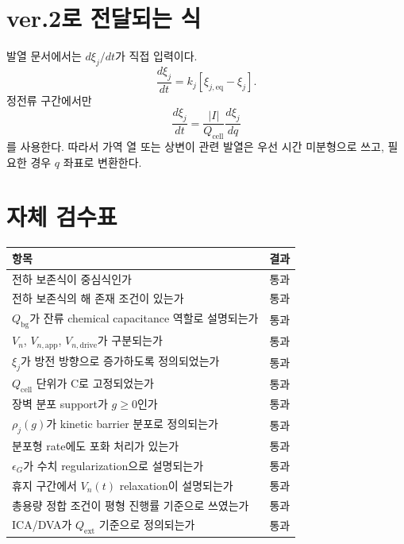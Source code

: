 \documentclass[11pt,a4paper]{article}
\newcommand{\app}{\mathrm{app}}
\newcommand{\drive}{\mathrm{drive}}
\newcommand{\bg}{\mathrm{bg}}
\newcommand{\cell}{\mathrm{cell}}
\newcommand{\ext}{\mathrm{ext}}
\begin{document}
\section{ver.2로 전달되는 식}
발열 문서에서는 \(d\xi_j/dt\)가 직접 입력이다.
\begin{equation}
\frac{d\xi_j}{dt}=k_j\left[\xi_{j,\mathrm{eq}}-\xi_j\right].
\end{equation}
정전류 구간에서만
\begin{equation}
\frac{d\xi_j}{dt}=\frac{|I|}{Q_{\cell}}\frac{d\xi_j}{dq}
\end{equation}
를 사용한다. 따라서 가역 열 또는 상변이 관련 발열은 우선 시간 미분형으로 쓰고, 필요한 경우 \(q\) 좌표로 변환한다.

\section{자체 검수표}
\begin{longtable}{p{} p{}}
\toprule
항목 & 결과 \\
\midrule
\endhead
전하 보존식이 중심식인가 & 통과 \\
전하 보존식의 해 존재 조건이 있는가 & 통과 \\
\(Q_{\bg}\)가 잔류 chemical capacitance 역할로 설명되는가 & 통과 \\
\(V_n\), \(V_{n,\app}\), \(V_{n,\drive}\)가 구분되는가 & 통과 \\
\(\xi_j\)가 방전 방향으로 증가하도록 정의되었는가 & 통과 \\
\(Q_{\cell}\) 단위가 C로 고정되었는가 & 통과 \\
장벽 분포 support가 \(g\ge0\)인가 & 통과 \\
\(\rho_j(g)\)가 kinetic barrier 분포로 정의되는가 & 통과 \\
분포형 rate에도 포화 처리가 있는가 & 통과 \\
\(\epsilon_G\)가 수치 regularization으로 설명되는가 & 통과 \\
휴지 구간에서 \(V_n(t)\) relaxation이 설명되는가 & 통과 \\
총용량 정합 조건이 평형 진행률 기준으로 쓰였는가 & 통과 \\
ICA/DVA가 \(Q_{\ext}\) 기준으로 정의되는가 & 통과 \\
\bottomrule
\end{longtable}
\end{document}
